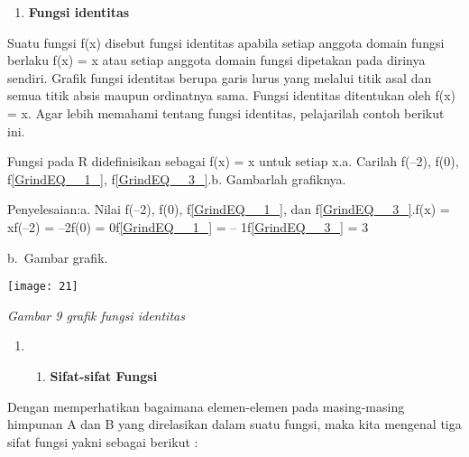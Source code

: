 \documentclass[11pt,fleqn]{book} %
\begin{document}
\begin{enumerate}
\item \textbf{\textit{ }Fungsi identitas}
\end{enumerate}

\noindent \textbf{}

\noindent Suatu fungsi f(x) disebut fungsi identitas apabila setiap anggota domain fungsi berlaku f(x) = x atau setiap anggota domain fungsi dipetakan pada dirinya sendiri. Grafik fungsi identitas berupa garis lurus yang melalui titik asal dan semua titik absis maupun ordinatnya sama. Fungsi identitas ditentukan oleh f(x) = x. Agar lebih memahami tentang fungsi identitas, pelajarilah contoh berikut ini.

\noindent Fungsi pada R didefinisikan sebagai f(x) = x untuk setiap x.a. Carilah f(--2), f(0), f\eqref{GrindEQ__1_}, f\eqref{GrindEQ__3_}.b. Gambarlah grafiknya.

\noindent Penyelesaian:a. Nilai f(--2), f(0), f\eqref{GrindEQ__1_}, dan f\eqref{GrindEQ__3_}.f(x) = xf(--2) = --2f(0) = 0f\eqref{GrindEQ__1_} = -- 1f\eqref{GrindEQ__3_} = 3

\noindent 

\noindent 

\noindent 

\noindent 

\noindent 

\noindent 

\noindent 

\noindent 

\noindent b.~Gambar grafik.

\begin{center}
\noindent \texttt{[image: 21]}
\end{center}

\textit{Gambar 9 grafik fungsi identitas}

\noindent 

\begin{enumerate}
\item \begin{enumerate}
\item  \textbf{Sifat-sifat Fungsi}
\end{enumerate}
\end{enumerate}

Dengan memperhatikan bagaimana elemen-elemen pada masing-masing himpunan A dan B yang direlasikan dalam suatu fungsi, maka kita mengenal tiga sifat fungsi yakni sebagai berikut :
\end{document}
